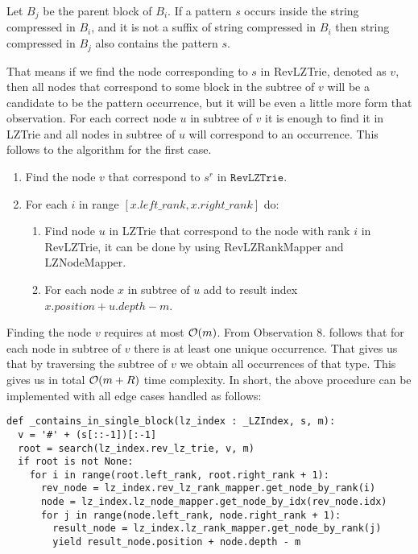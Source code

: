 \begin{observation}
    Let $B_j$ be the parent block of $B_i$. If a pattern $s$ occurs inside the string compressed in $B_i$, and it is not a suffix of string compressed in $B_i$ then string compressed in $B_j$ also contains the pattern $s$. 
\end{observation}

That means if we find the node corresponding to $s$ in RevLZTrie, denoted as $v$, then all nodes that correspond to some block in the subtree of $v$ will be a candidate to be the pattern occurrence, but it will be even a little more form that observation. For each correct node $u$ in subtree of $v$ it is enough to find it in LZTrie and all nodes in subtree of $u$ will correspond to an occurrence. This follows to the algorithm for the first case.

\begin{enumerate}
    \item Find the node $v$ that correspond to $s^r$ in $\texttt{RevLZTrie}$.
    \item For each $i$ in range $[x.left\_rank, x.right\_rank]$ do:
    \begin{enumerate}
        \item Find node $u$ in LZTrie that correspond to the node with rank $i$ in RevLZTrie, it can be done by using RevLZRankMapper and LZNodeMapper.
        \item For each node $x$ in subtree of $u$ add to result index $x.position + u.depth - m$.
    
    \end{enumerate}
\end{enumerate}

Finding the node $v$ requires at most $\mathcal{O}(m)$. From Observation 8. follows that for each node in subtree of $v$ there is at least one unique occurrence. That gives us that by traversing the subtree of $v$ we obtain all occurrences of that type. This gives us in total $\mathcal{O}(m + R)$ time complexity. In short, the above procedure can be implemented with all edge cases handled as follows:

\begin{verbatim}
def _contains_in_single_block(lz_index : _LZIndex, s, m):
  v = '#' + (s[::-1])[:-1]
  root = search(lz_index.rev_lz_trie, v, m)
  if root is not None:
    for i in range(root.left_rank, root.right_rank + 1):
      rev_node = lz_index.rev_lz_rank_mapper.get_node_by_rank(i)
      node = lz_index.lz_node_mapper.get_node_by_idx(rev_node.idx)
      for j in range(node.left_rank, node.right_rank + 1):
        result_node = lz_index.lz_rank_mapper.get_node_by_rank(j)
        yield result_node.position + node.depth - m
\end{verbatim}

